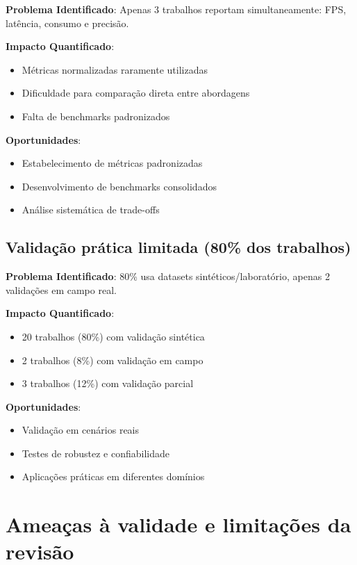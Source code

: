 \textbf{Problema Identificado}: Apenas 3 trabalhos reportam simultaneamente: FPS, latência, consumo e precisão.

\textbf{Impacto Quantificado}:
\begin{itemize}
    \item Métricas normalizadas raramente utilizadas
    \item Dificuldade para comparação direta entre abordagens
    \item Falta de benchmarks padronizados
\end{itemize}

\textbf{Oportunidades}:
\begin{itemize}
    \item Estabelecimento de métricas padronizadas
    \item Desenvolvimento de benchmarks consolidados
    \item Análise sistemática de trade-offs
\end{itemize}

\subsection{Validação prática limitada (80\% dos trabalhos)}\label{subsec:validacao_pratica_limitada}

\textbf{Problema Identificado}: 80\% usa datasets sintéticos/laboratório, apenas 2 validações em campo real.

\textbf{Impacto Quantificado}:
\begin{itemize}
    \item 20 trabalhos (80\%) com validação sintética
    \item 2 trabalhos (8\%) com validação em campo
    \item 3 trabalhos (12\%) com validação parcial
\end{itemize}

\textbf{Oportunidades}:
\begin{itemize}
    \item Validação em cenários reais
    \item Testes de robustez e confiabilidade
    \item Aplicações práticas em diferentes domínios
\end{itemize}

\section{Ameaças à validade e limitações da revisão}\label{sec:ameacas_limitacoes}

